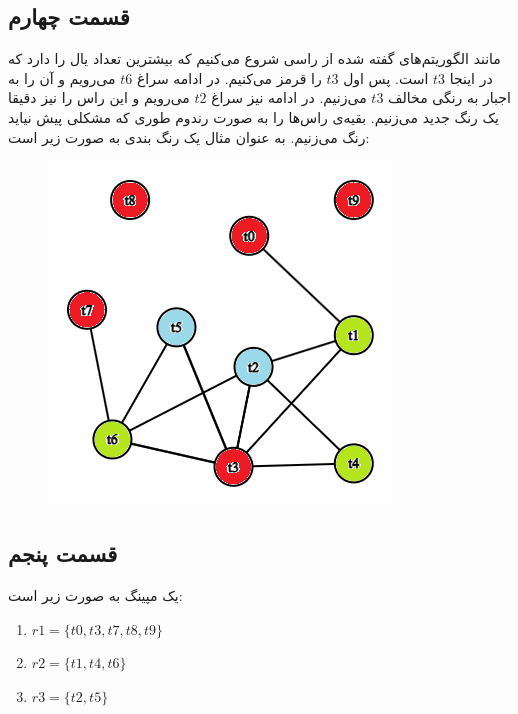 \documentclass[]{article}
\begin{document}
\subsection*{قسمت چهارم}
مانند الگوریتم‌های گفته شده از راسی شروع می‌کنیم که بیشترین تعداد یال را دارد که در اینجا
$t3$
است. پس اول
$t3$
را قرمز می‌کنیم. در ادامه سراغ
$t6$
می‌رویم و آن را به اجبار به رنگی مخالف
$t3$
می‌زنیم. در ادامه نیز سراغ
$t2$
می‌رویم و این راس را نیز دقیقا یک رنگ جدید می‌زنیم. بقیه‌ی راس‌ها را به صورت رندوم طوری که مشکلی
پیش نیاید رنگ می‌زنیم. به عنوان مثال یک رنگ بندی به صورت زیر است:
\begin{figure}[H]
    \centering
    \includegraphics[scale=0.5]{figure/Q6-d.png}
\end{figure}
\subsection*{قسمت پنجم}
یک مپینگ به صورت زیر است:
\begin{enumerate}
    \item $r1 = \{t0, t3, t7, t8, t9\}$
    \item $r2 = \{t1, t4, t6\}$
    \item $r3 = \{t2, t5\}$
\end{enumerate}
\end{document}
